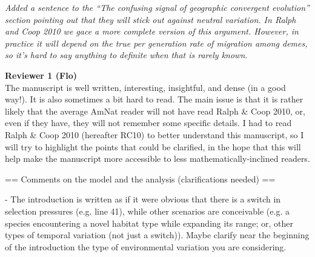 \documentclass[12pt,letterpaper]{article}
\newcommand{\response}[1]{\emph{ \color{blue} #1}}
\begin{document}
\response{Added a sentence to the ``The confusing signal of geographic convergent evolution'' section pointing out that they will stick out against neutral variation. In Ralph and Coop 2010 we gace a more complete version of this argument. However, in practice it will depend on the true per generation rate of migration among demes, so it's hard to say anything to definite when that is rarely known.}

\newpage


{\bf Reviewer 1 (Flo)}\\


The manuscript is well written, interesting, insightful, and dense (in a good way!). It is also sometimes a bit hard to read. The main issue is that it is rather likely that the average AmNat reader will not have read Ralph \& Coop 2010, or, even if they have, they will not remember some specific details. I had to read Ralph \& Coop 2010 (hereafter RC10) to better understand this manuscript, so I will try to highlight the points that could be clarified, in the hope that this will help make the manuscript more accessible to less mathematically-inclined readers.

== Comments on the model and the analysis (clarifications needed) ==

- The introduction is written as if it were obvious that there is a switch in selection pressures (e.g. line 41), while other scenarios are conceivable (e.g. a species encountering a novel habitat type while expanding its range; or, other types of temporal variation (not just a switch)). Maybe clarify near the beginning of the introduction the type of environmental variation you are considering.
\end{document}
